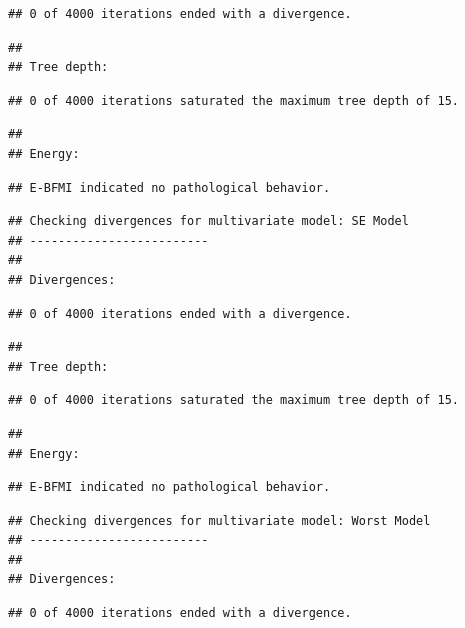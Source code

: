\documentclass[
]{article}
\begin{document}
\begin{verbatim}
## 0 of 4000 iterations ended with a divergence.
\end{verbatim}

\begin{verbatim}
## 
## Tree depth:
\end{verbatim}

\begin{verbatim}
## 0 of 4000 iterations saturated the maximum tree depth of 15.
\end{verbatim}

\begin{verbatim}
## 
## Energy:
\end{verbatim}

\begin{verbatim}
## E-BFMI indicated no pathological behavior.
\end{verbatim}

\begin{verbatim}
## Checking divergences for multivariate model: SE Model 
## -------------------------
## 
## Divergences:
\end{verbatim}

\begin{verbatim}
## 0 of 4000 iterations ended with a divergence.
\end{verbatim}

\begin{verbatim}
## 
## Tree depth:
\end{verbatim}

\begin{verbatim}
## 0 of 4000 iterations saturated the maximum tree depth of 15.
\end{verbatim}

\begin{verbatim}
## 
## Energy:
\end{verbatim}

\begin{verbatim}
## E-BFMI indicated no pathological behavior.
\end{verbatim}

\begin{verbatim}
## Checking divergences for multivariate model: Worst Model 
## -------------------------
## 
## Divergences:
\end{verbatim}

\begin{verbatim}
## 0 of 4000 iterations ended with a divergence.
\end{verbatim}
\end{document}

